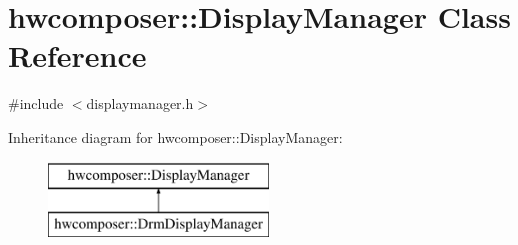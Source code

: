 \hypertarget{classhwcomposer_1_1DisplayManager}{}\section{hwcomposer\+:\+:Display\+Manager Class Reference}
\label{classhwcomposer_1_1DisplayManager}


{\ttfamily \#include $<$displaymanager.\+h$>$}

Inheritance diagram for hwcomposer\+:\+:Display\+Manager\+:\begin{figure}[H]
\begin{center}
\leavevmode
\includegraphics[height=2.000000cm]{classhwcomposer_1_1DisplayManager}
\end{center}
\end{figure}
